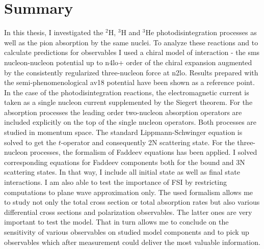 \chapter{Summary}

In this thesis, I investigated the $^2$H, $^3$H and $^3$He photodisintegration processes
as well as the pion absorption by the same nuclei. To analyze these reactions
and to calculate predictions for observables I used a chiral model of interaction
- the \gls{sms} nucleon-nucleon potential up to \gls{n4lo+} order of the chiral expansion
augmented by the consistently regularized three-nucleon force at \gls{n2lo}.
Results prepared with the semi-phenomenological \gls{av18} potential have been shown as 
a reference point. 
In the case of the photodisintegration reactions, the electromagnetic current is taken
as a single nucleon current supplemented by the Siegert theorem.
For the absorption processes the leading order two-nucleon absorption operators are included explicitly
on the top of the single nucleon operators.
Both processes are studied in momentum space.
The standard Lippmann-Schwinger equation is solved to get the $t$-operator and consequently
2N scattering state. For the three-nucleon processes, the formalism of Faddeev equations
has been applied.
I solved corresponding equations for Faddeev components both for the bound and 3N scattering states.
In that way, I include all initial state as well as final state interactions.
I am also able to test the importance of FSI by restricting computations to plane wave approximation only.
The used formalism allows me to study not only the total cross section or total absorption rates
but also various differential cross sections and polarization
observables. The latter ones are very important to test the model.
That in turn allows me to conclude on the sensitivity of various observables on studied model components and to 
pick up observables which after measurement could deliver the most valuable information.

